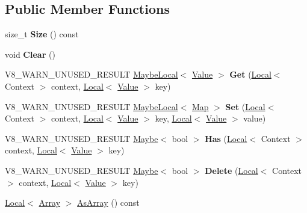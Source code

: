 \subsection*{Public Member Functions}
\begin{DoxyCompactItemize}
\item 
\mbox{\label{classv8_1_1Map_a62cb76161d9a4a62a14e32b2f3f5b490}} 
size\+\_\+t {\bfseries Size} () const
\item 
\mbox{\label{classv8_1_1Map_a06ee0d566d206058a7fe22c140000be4}} 
void {\bfseries Clear} ()
\item 
\mbox{\label{classv8_1_1Map_a18b0a4d81e6900e854ceeabb516b5d72}} 
V8\+\_\+\+W\+A\+R\+N\+\_\+\+U\+N\+U\+S\+E\+D\+\_\+\+R\+E\+S\+U\+LT \mbox{\hyperlink{classv8_1_1MaybeLocal}{Maybe\+Local}}$<$ \mbox{\hyperlink{classv8_1_1Value}{Value}} $>$ {\bfseries Get} (\mbox{\hyperlink{classv8_1_1Local}{Local}}$<$ Context $>$ context, \mbox{\hyperlink{classv8_1_1Local}{Local}}$<$ \mbox{\hyperlink{classv8_1_1Value}{Value}} $>$ key)
\item 
\mbox{\label{classv8_1_1Map_a46f73b93abc9601a9a90e2051a64bcd3}} 
V8\+\_\+\+W\+A\+R\+N\+\_\+\+U\+N\+U\+S\+E\+D\+\_\+\+R\+E\+S\+U\+LT \mbox{\hyperlink{classv8_1_1MaybeLocal}{Maybe\+Local}}$<$ \mbox{\hyperlink{classv8_1_1Map}{Map}} $>$ {\bfseries Set} (\mbox{\hyperlink{classv8_1_1Local}{Local}}$<$ Context $>$ context, \mbox{\hyperlink{classv8_1_1Local}{Local}}$<$ \mbox{\hyperlink{classv8_1_1Value}{Value}} $>$ key, \mbox{\hyperlink{classv8_1_1Local}{Local}}$<$ \mbox{\hyperlink{classv8_1_1Value}{Value}} $>$ value)
\item 
\mbox{\label{classv8_1_1Map_abc50dbc81ed6f6eecdb552238b97182b}} 
V8\+\_\+\+W\+A\+R\+N\+\_\+\+U\+N\+U\+S\+E\+D\+\_\+\+R\+E\+S\+U\+LT \mbox{\hyperlink{classv8_1_1Maybe}{Maybe}}$<$ bool $>$ {\bfseries Has} (\mbox{\hyperlink{classv8_1_1Local}{Local}}$<$ Context $>$ context, \mbox{\hyperlink{classv8_1_1Local}{Local}}$<$ \mbox{\hyperlink{classv8_1_1Value}{Value}} $>$ key)
\item 
\mbox{\label{classv8_1_1Map_a3e587498e1629ae10255f3c2a2beb9dc}} 
V8\+\_\+\+W\+A\+R\+N\+\_\+\+U\+N\+U\+S\+E\+D\+\_\+\+R\+E\+S\+U\+LT \mbox{\hyperlink{classv8_1_1Maybe}{Maybe}}$<$ bool $>$ {\bfseries Delete} (\mbox{\hyperlink{classv8_1_1Local}{Local}}$<$ Context $>$ context, \mbox{\hyperlink{classv8_1_1Local}{Local}}$<$ \mbox{\hyperlink{classv8_1_1Value}{Value}} $>$ key)
\item 
\mbox{\hyperlink{classv8_1_1Local}{Local}}$<$ \mbox{\hyperlink{classv8_1_1Array}{Array}} $>$ \mbox{\hyperlink{classv8_1_1Map_a924483cc18fa2f287a43ca2d7eaef763}{As\+Array}} () const
\end{DoxyCompactItemize}

